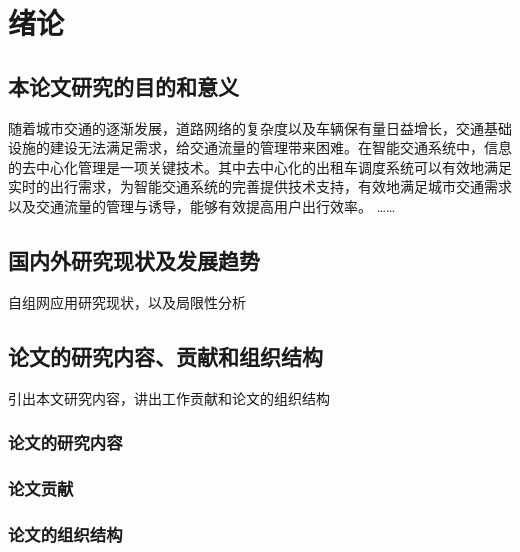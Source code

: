 \chapter{绪论}
\section{本论文研究的目的和意义}

随着城市交通的逐渐发展，道路网络的复杂度以及车辆保有量日益增长，交通基础设施的建设无法满足需求，给交通流量的管理带来困难。在智能交通系统中，信息的去中心化管理是一项关键技术。其中去中心化的出租车调度系统可以有效地满足实时的出行需求，为智能交通系统的完善提供技术支持，有效地满足城市交通需求以及交通流量的管理与诱导，能够有效提高用户出行效率。
……

\section{国内外研究现状及发展趋势}
自组网应用研究现状，以及局限性分析
\section{论文的研究内容、贡献和组织结构}
引出本文研究内容，讲出工作贡献和论文的组织结构
\subsection{论文的研究内容}
\subsection{论文贡献}
\subsection{论文的组织结构}